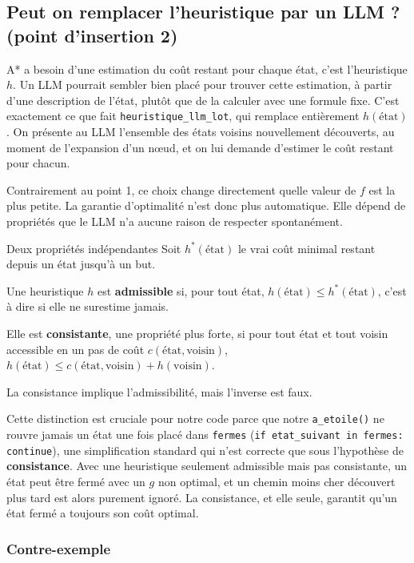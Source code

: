 \documentclass[11pt,a4paper]{article}
\begin{document}
\subsection{Peut on remplacer l'heuristique par un LLM ? (point d'insertion 2)}
\label{sec:point2}

A* a besoin d'une estimation du coût restant pour chaque état, c'est l'heuristique $h$. Un LLM pourrait sembler bien placé pour trouver cette estimation, à partir d'une description de l'état, plutôt que de la calculer avec une formule fixe. C'est exactement ce que fait \texttt{heuristique\_llm\_lot}, qui remplace entièrement $h(\text{état})$. On présente au LLM l'ensemble des états voisins nouvellement découverts, au moment de l'expansion d'un nœud, et on lui demande d'estimer le coût restant pour chacun.

Contrairement au point 1, ce choix change directement quelle valeur de $f$ est la plus petite. La garantie d'optimalité n'est donc plus automatique. Elle dépend de propriétés que le LLM n'a aucune raison de respecter spontanément.

\begin{propobox}{Deux propriétés indépendantes}
Soit $h^*(\text{état})$ le vrai coût minimal restant depuis un état jusqu'à un but.

\medskip
Une heuristique $h$ est \textbf{admissible} si, pour tout état, $h(\text{état}) \le h^*(\text{état})$, c'est à dire si elle ne surestime jamais.

\medskip
Elle est \textbf{consistante}, une propriété plus forte, si pour tout état et tout voisin accessible en un pas de coût $c(\text{état}, \text{voisin})$, $h(\text{état}) \le c(\text{état}, \text{voisin}) + h(\text{voisin})$.

\medskip
La consistance implique l'admissibilité, mais l'inverse est faux.
\end{propobox}

Cette distinction est cruciale pour notre code parce que notre \texttt{a\_etoile()} ne rouvre jamais un état une fois placé dans \texttt{fermes} (\texttt{if etat\_suivant in fermes: continue}), une simplification standard qui n'est correcte que sous l'hypothèse de \textbf{consistance}. Avec une heuristique seulement admissible mais pas consistante, un état peut être fermé avec un $g$ non optimal, et un chemin moins cher découvert plus tard est alors purement ignoré. La consistance, et elle seule, garantit qu'un état fermé a toujours son coût optimal.

\subsubsection*{Contre-exemple}
\end{document}
